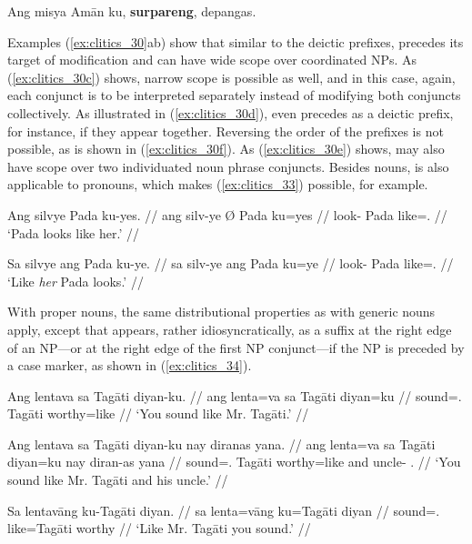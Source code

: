 \a\label{ex:clitics_32b}\ljudge{*}
	Ang misya Amān ku, \textbf{surpareng}, depangas.
\xe

Examples (\ref{ex:clitics_30}ab) show that similar to the deictic prefixes,
 precedes its target of modification and can have wide scope
over coordinated NPs. As (\ref{ex:clitics_30c}) shows, narrow scope is possible
as well, and in this case, again, each conjunct is to be interpreted separately
instead of  modifying both conjuncts collectively. As
illustrated in (\ref{ex:clitics_30d}),  even precedes
 as a deictic prefix, for instance, if they appear together.
Reversing the order of the prefixes is not possible, as is shown in
(\ref{ex:clitics_30f}). As (\ref{ex:clitics_30e}) shows,  may
also have scope over two individuated noun phrase conjuncts. Besides nouns,
 is also applicable to pronouns, which makes
(\ref{ex:clitics_33}) possible, for example.

\pex\label{ex:clitics_33}
\a\label{ex:clitics_33a}\begingl
	\gla Ang silvye {} Pada ku-yes. //
	\glb ang silv-ye Ø Pada ku=yes //
	\glc \AgtT{} look-\TsgF{} \Top{} Pada like=\TsgF{}.\Parg{} //
	\glft `Pada looks like her.' //
\endgl

\a\label{ex:clitics_33b}\begingl
	\gla Sa silvye ang Pada ku-ye. //
	\glb sa silv-ye ang Pada ku=ye //
	\glc \PatT{} look-\TsgF{} \Aarg{} Pada like=\TsgF{}.\Top{} //
	\glft `Like \emph{her} Pada looks.' //
\endgl
\xe

With proper nouns, the same distributional properties as with generic nouns
apply, except that  appears, rather idiosyncratically, as a
suffix at the right edge of an NP---or at the right edge of the first NP
conjunct---if the NP is preceded by a case marker, as shown in
(\ref{ex:clitics_34}).

\pex\label{ex:clitics_34}
\a\label{ex:clitics_34a}\begingl
	\gla Ang lentava sa Tagāti diyan-ku. //
	\glb ang lenta=va sa Tagāti diyan=ku //
	\glc \AgtT{} sound=\Second{}.\Top{} \Parg{} Tagāti worthy=like //
	\glft `You sound like Mr. Tagāti.' //
\endgl

\a\label{ex:clitics_34b}\begingl
	\gla Ang lentava sa Tagāti diyan-ku nay diranas yana. //
	\glb ang lenta=va sa Tagāti diyan=ku nay diran-as yana //
	\glc \AgtT{} sound=\Second{}.\Top{} \Parg{} Tagāti worthy=like and 
		uncle-\Parg{} \TsgM{}.\Gen{} //
	\glft `You sound like Mr. Tagāti and his uncle.' //
\endgl

\a\label{ex:clitics_34c}\begingl
	\gla Sa lentavāng ku-​Tagāti diyan. //
	\glb sa lenta=vāng ku=​Tagāti diyan //
	\glc \PatT{} sound=\Second{}.\Aarg{} like=​Tagāti worthy //
	\glft `Like Mr. Tagāti you sound.' //
\endgl
\xe

